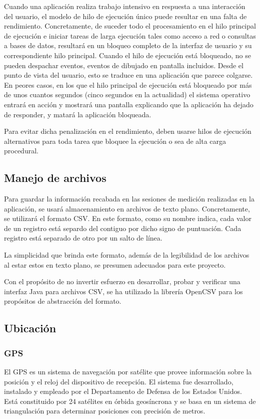     Cuando una aplicación realiza trabajo intensivo en respuesta a una interacción del usuario, el modelo de hilo de ejecución único puede resultar en una falta de rendimiento. Concretamente, de suceder todo el procesamiento en el hilo principal de ejecución e iniciar tareas de larga ejecución tales como acceso a red o consultas a bases de datos, resultará en un bloqueo completo de la interfaz de usuario y su correspondiente hilo principal. Cuando el hilo de ejecución está bloqueado, no se pueden despachar eventos, eventos de dibujado en pantalla incluidos. Desde el punto de vista del usuario, esto se traduce en una aplicación que parece colgarse. En peores casos, en los que el hilo principal de ejecución está bloqueado por más de unos cuantos segundos (cinco segundos en la actualidad) el sistema operativo entrará en acción y mostrará una pantalla explicando que la aplicación ha dejado de responder, y matará la aplicación bloqueada. 

    Para evitar dicha penalización en el rendimiento, deben usarse hilos de ejecución alternativos para toda tarea que bloquee la ejecución o sea de alta carga procedural.

\FloatBarrier
\subsection{Manejo de archivos}
    Para guardar la información recabada en las sesiones de medición realizadas en la aplicación, se usará almacenamiento en archivos de texto plano. Concretamente, se utilizará el formato \ac{CSV}. En este formato, como su nombre indica, cada valor de un registro está separdo del contiguo por dicho signo de puntuación. Cada registro está separado de otro por un salto de línea.

    La simplicidad que brinda este formato, además de la legibilidad de los archivos al estar estos en texto plano, se presumen adecuados para este proyecto.

    Con el propósito de no invertir esfuerzo en desarrollar, probar y verificar una interfaz Java para archivos CSV, se ha utilizado la librería OpenCSV para los propósitos de abstracción del formato.
    
\subsection{Ubicación}
\subsubsection{GPS}
El \ac{GPS} es un sistema de navegación por satélite que provee información sobre la posición y el reloj del dispositivo de recepción. El sistema fue desarrollado, instalado y empleado por el Departamento de Defensa de los Estados Unidos. Está constituido por 24 satélites en órbida geosíncrona y se basa en un sistema de triangulación para determinar posiciones con precisión de metros.

